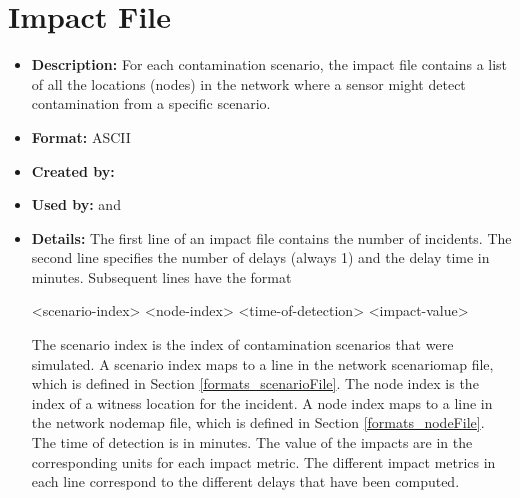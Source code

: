 \section{Impact File}\label{formats_impactFile}
\begin{itemize}
\item {\bfseries Description:} For each contamination scenario, the impact file 
contains a list of all the locations (nodes) in the network where a sensor might 
detect contamination from a specific scenario.
\item {\bfseries Format:} ASCII 
\item {\bfseries Created by:}  
\item {\bfseries Used by:}  and  
\item {\bfseries Details:} The first line of an impact file 
contains the number of incidents. The second line specifies the number of delays (always 1) and the delay time in minutes.
Subsequent lines have the format
\begin{unknownListing}
   <scenario-index> <node-index> <time-of-detection> <impact-value>
\end{unknownListing}
The scenario index is the index of contamination scenarios that were simulated. 
A scenario index maps to a line in the network scenariomap file, which is defined in Section \ref{formats_scenarioFile}. 
The node index is the index of a witness location for the incident. A node index maps to a line 
in the network nodemap file, which is defined in Section \ref{formats_nodeFile}. The time of detection is in minutes. 
The value of the impacts are in the corresponding units for each impact metric. The different 
impact metrics in each line correspond to the different delays that have been computed. 
\end{itemize}


